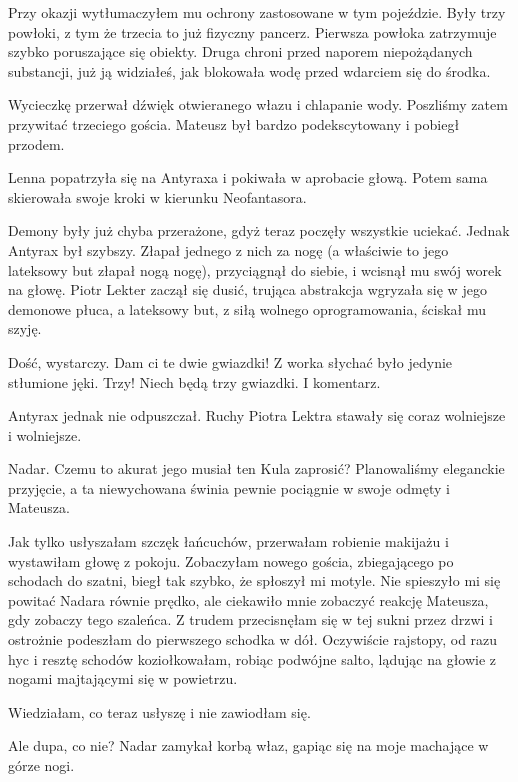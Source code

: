 Przy okazji wytłumaczyłem mu ochrony zastosowane w tym pojeździe. Były trzy powłoki, z tym że trzecia to już fizyczny pancerz. 
Pierwsza powłoka zatrzymuje szybko poruszające się obiekty.
Druga chroni przed naporem niepożądanych substancji, już ją widziałeś, jak blokowała wodę przed wdarciem się do środka.

Wycieczkę przerwał dźwięk otwieranego włazu i chlapanie wody.
Poszliśmy zatem przywitać trzeciego gościa. Mateusz był bardzo podekscytowany i pobiegł przodem.

\divider{}

Lenna popatrzyła się na Antyraxa i pokiwała w aprobacie głową.
Potem sama skierowała swoje kroki w kierunku Neofantasora.

Demony były już chyba przerażone, gdyż teraz poczęły wszystkie uciekać.
Jednak Antyrax był szybszy. Złapał jednego z nich za nogę (a właściwie to jego lateksowy but złapał nogą nogę), przyciągnął do siebie, i wcisnął mu swój worek na głowę.
Piotr Lekter zaczął się dusić, trująca abstrakcja wgryzała się w jego demonowe płuca, a lateksowy but, z siłą wolnego oprogramowania, ściskał mu szyję.

\ds{} Dość, wystarczy. Dam ci te dwie gwiazdki! \dm{} Z worka słychać było jedynie stłumione jęki. \dm{} Trzy! Niech będą trzy gwiazdki. I komentarz. \de{}

Antyrax jednak nie odpuszczał. Ruchy Piotra Lektra stawały się coraz wolniejsze i wolniejsze.

\divider{}

Nadar. Czemu to akurat jego musiał ten Kula zaprosić?
Planowaliśmy eleganckie przyjęcie, a ta niewychowana świnia pewnie pociągnie w swoje odmęty i Mateusza.

Jak tylko usłyszałam szczęk łańcuchów, przerwałam robienie makijażu i wystawiłam głowę z pokoju.
Zobaczyłam nowego gościa, zbiegającego po schodach do szatni, biegł tak szybko, że spłoszył mi motyle.
Nie spieszyło mi się powitać Nadara równie prędko, ale ciekawiło mnie zobaczyć reakcję Mateusza, gdy zobaczy tego szaleńca.
Z trudem przecisnęłam się w tej sukni przez drzwi i ostrożnie podeszłam do pierwszego schodka w dół.
Oczywiście rajstopy, od razu hyc i resztę schodów koziołkowałam, robiąc podwójne salto, lądując na głowie z nogami majtającymi się w powietrzu.

Wiedziałam, co teraz usłyszę i nie zawiodłam się.

\ds{} Ale dupa, co nie? \dm{} Nadar zamykał korbą właz, gapiąc się na moje machające w górze nogi. \de{}

